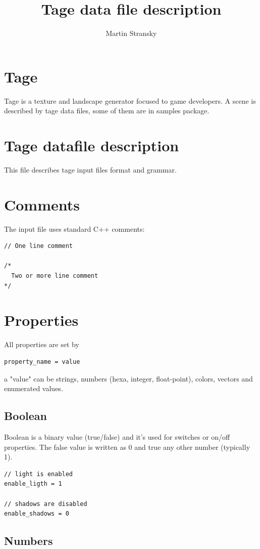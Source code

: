 \documentclass[9pt]{article}
\author{Martin Stransky}
\title{Tage data file description}
\begin{document}

\tableofcontents

\newpage
\section{Tage}

Tage is a texture and landscape generator focused to game developers. 
A scene is described by tage data files, some of them are 
in samples package.

\section{Tage datafile description}

This file describes tage input files format and grammar.

\section{Comments}

The input file uses standard C++ comments:
\begin{verbatim}
// One line comment

/*
  Two or more line comment
*/
\end{verbatim}

\section{Properties}

All properties are set by
\begin{verbatim}
property_name = value
\end{verbatim}
a "value" can be strings, numbers (hexa, integer, float-point), colors, vectors
and enumerated values.

\subsection{Boolean}

Boolean is a binary value (true/false) and it's used for switches
or on/off properties. The false value is written as 0 and true any other
number (typically 1).
\begin{verbatim}
// light is enabled 
enable_ligth = 1

// shadows are disabled
enable_shadows = 0
\end{verbatim}

\subsection{Numbers}
\end{document}
